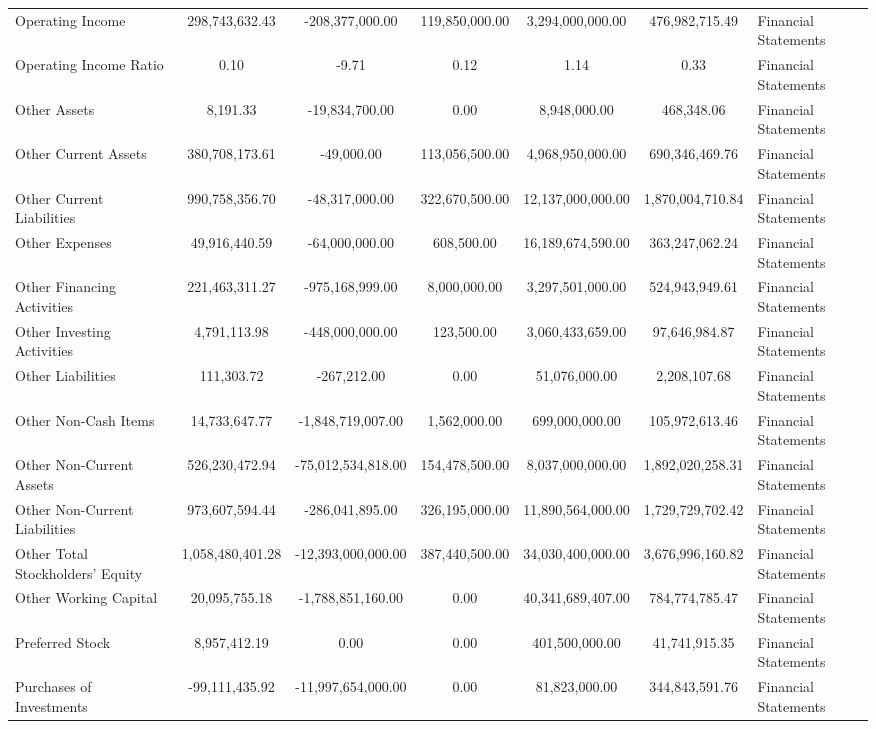 \begin{tabular}{lccccc}
Operating Income & 298,743,632.43 & -208,377,000.00 & 119,850,000.00 & 3,294,000,000.00 & 476,982,715.49 & Financial Statements \\
Operating Income Ratio & 0.10 & -9.71 & 0.12 & 1.14 & 0.33 & Financial Statements \\
Other Assets & 8,191.33 & -19,834,700.00 & 0.00 & 8,948,000.00 & 468,348.06 & Financial Statements \\
Other Current Assets & 380,708,173.61 & -49,000.00 & 113,056,500.00 & 4,968,950,000.00 & 690,346,469.76 & Financial Statements \\
Other Current Liabilities & 990,758,356.70 & -48,317,000.00 & 322,670,500.00 & 12,137,000,000.00 & 1,870,004,710.84 & Financial Statements \\
Other Expenses & 49,916,440.59 & -64,000,000.00 & 608,500.00 & 16,189,674,590.00 & 363,247,062.24 & Financial Statements \\
Other Financing Activities & 221,463,311.27 & -975,168,999.00 & 8,000,000.00 & 3,297,501,000.00 & 524,943,949.61 & Financial Statements \\
Other Investing Activities & 4,791,113.98 & -448,000,000.00 & 123,500.00 & 3,060,433,659.00 & 97,646,984.87 & Financial Statements \\
Other Liabilities & 111,303.72 & -267,212.00 & 0.00 & 51,076,000.00 & 2,208,107.68 & Financial Statements \\
Other Non-Cash Items & 14,733,647.77 & -1,848,719,007.00 & 1,562,000.00 & 699,000,000.00 & 105,972,613.46 & Financial Statements \\
Other Non-Current Assets & 526,230,472.94 & -75,012,534,818.00 & 154,478,500.00 & 8,037,000,000.00 & 1,892,020,258.31 & Financial Statements \\
Other Non-Current Liabilities & 973,607,594.44 & -286,041,895.00 & 326,195,000.00 & 11,890,564,000.00 & 1,729,729,702.42 & Financial Statements \\
Other Total Stockholders' Equity & 1,058,480,401.28 & -12,393,000,000.00 & 387,440,500.00 & 34,030,400,000.00 & 3,676,996,160.82 & Financial Statements \\
Other Working Capital & 20,095,755.18 & -1,788,851,160.00 & 0.00 & 40,341,689,407.00 & 784,774,785.47 & Financial Statements \\
Preferred Stock & 8,957,412.19 & 0.00 & 0.00 & 401,500,000.00 & 41,741,915.35 & Financial Statements \\
Purchases of Investments & -99,111,435.92 & -11,997,654,000.00 & 0.00 & 81,823,000.00 & 344,843,591.76 & Financial Statements \\

\end{tabular}
